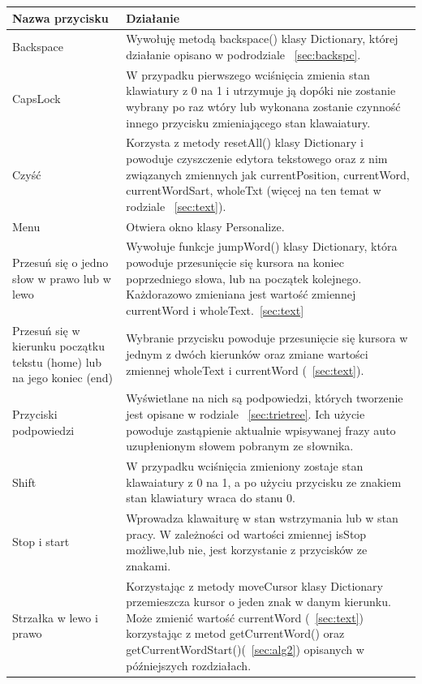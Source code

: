 \documentclass[twoside,a4paper]{book}
\begin{document}
\begin{table}
    \begin{tabular}{|p{4cm}|p{8.5cm}|}
        \hline
    \textbf{Nazwa przycisku} & \textbf{Działanie}\\ \hline
     Backspace & Wywołuję metodą backspace() klasy Dictionary, której działanie opisano w podrodziale ~\ref{sec:backspc}.\\ \hline
    CapsLock & W przypadku pierwszego wciśnięcia zmienia stan klawiatury z 0 na 1 i utrzymuje ją dopóki nie zostanie wybrany po raz wtóry lub wykonana zostanie czynność innego przycisku zmieniającego stan klawaiatury. \\ \hline
 Czyść & Korzysta z metody resetAll() klasy Dictionary i powoduje czyszczenie edytora tekstowego oraz z nim związanych zmiennych jak currentPosition, currentWord, currentWordSart, wholeTxt (więcej na ten temat w rodziale ~\ref{sec:text}).\\ \hline
Menu & Otwiera okno klasy Personalize.\\ \hline
Przesuń się o jedno słow w prawo lub w lewo & Wywołuje funkcje jumpWord() klasy Dictionary, która powoduje przesunięcie się kursora na koniec poprzedniego słowa, lub na początek kolejnego. Każdorazowo zmieniana jest wartość zmiennej currentWord i wholeText.~\ref{sec:text}\\ \hline
 Przesuń się w kierunku początku tekstu (home) lub na jego koniec (end) & Wybranie przycisku powoduje przesunięcie się kursora w jednym z dwóch kierunków oraz zmiane wartości zmiennej wholeText i currentWord (~\ref{sec:text}). \\ \hline
 Przyciski podpowiedzi & Wyświetlane na nich są podpowiedzi, których tworzenie jest opisane w rodziale ~\ref{sec:trietree}. Ich użycie powoduje zastąpienie aktualnie wpisywanej frazy auto uzupłenionym słowem pobranym ze słownika. \\ \hline
  Shift & W przypadku wciśnięcia zmieniony zostaje stan klawaiatury z 0 na 1, a po użyciu przycisku ze znakiem stan klawiatury wraca do stanu 0. \\ \hline
   Stop i start & Wprowadza klawaiturę w stan wstrzymania lub w stan pracy. W zależności od wartości zmiennej isStop możliwe,lub nie, jest korzystanie z przycisków ze znakami.\\ \hline
   Strzałka w lewo i prawo &  Korzystając z metody moveCursor klasy Dictionary przemieszcza kursor o jeden znak w danym kierunku. Może zmienić wartość currentWord (~\ref{sec:text}) korzystając z metod getCurrentWord() oraz getCurrentWordStart()(~\ref{sec:alg2}) opisanych w późniejszych rozdziałach.\\ \hline

\end{tabular}
\end{table}
\end{document}
